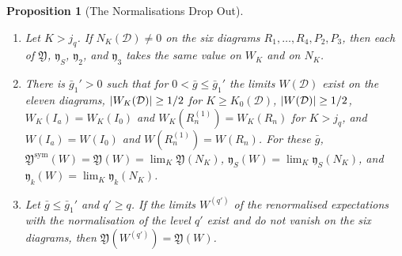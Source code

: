 \documentclass[11pt]{preprint}
\DeclarePairedDelimiter{\abs}{\lvert}{\rvert}
\numberwithin{equation}{section}
\newtheorem{proposition}[theorem]{Proposition}
\theoremstyle{definition}
\theoremstyle{remark}
\theoremstyle{plain}
\begin{document}
\begin{proposition}[The Normalisations Drop Out]\label{prop:normalisations-drop-out}
\begin{enumerate}[label=(\roman*)]
\item Let $K > j_q$. If $N_K(\mathcal D) \neq 0$ on the six diagrams $R_1, \dots, R_4, P_2, P_3$, then each of $\mathfrak Y$, $\mathfrak y_S$, $\mathfrak y_2$, and $\mathfrak y_3$ takes the same value on $W_K$ and on $N_K$.
\item There is $\bar g_1' > 0$ such that for $0 < \bar g \leq \bar g_1'$ the limits $W(\mathcal D)$ exist on the eleven diagrams, $\abs{W_K(\mathcal D)} \geq 1/2$ for $K \geq K_0(\mathcal D)$, $\abs{W(\mathcal D)} \geq 1/2$, $W_K(I_a) = W_K(I_0)$ and $W_K(R^{(1)}_n) = W_K(R_n)$ for $K > j_q$, and $W(I_a) = W(I_0)$ and $W(R^{(1)}_n) = W(R_n)$. For these $\bar g$, $\mathfrak Y^{\mathrm{sym}}(W) = \mathfrak Y(W) = \lim_K\mathfrak Y(N_K)$, $\mathfrak y_S(W) = \lim_K\mathfrak y_S(N_K)$, and $\mathfrak y_k(W) = \lim_K\mathfrak y_k(N_K)$.
\item Let $\bar g \leq \bar g_1'$ and $q' \geq q$. If the limits $W^{(q')}$ of the renormalised expectations with the normalisation of the level $q'$ exist and do not vanish on the six diagrams, then $\mathfrak Y(W^{(q')}) = \mathfrak Y(W)$.
\end{enumerate}
\end{proposition}
\end{document}
